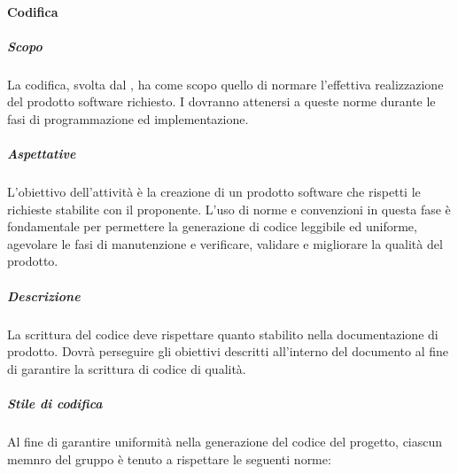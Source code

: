			\paragraph{Codifica}	
				\subparagraph{Scopo}
				La codifica, svolta dal , ha come scopo quello di normare l'effettiva realizzazione del prodotto software richiesto. I  dovranno attenersi a queste norme durante le fasi di programmazione ed implementazione.
				\subparagraph{Aspettative}
				L'obiettivo dell'attività è la creazione di un prodotto software che rispetti le richieste stabilite con il proponente. L'uso di norme e convenzioni in questa fase è fondamentale per permettere la generazione di codice leggibile ed uniforme, agevolare le fasi di manutenzione e verificare, validare e migliorare la qualità del prodotto.
				\subparagraph{Descrizione}
				La scrittura del codice deve rispettare quanto stabilito nella documentazione di prodotto. Dovrà perseguire gli obiettivi descritti all'interno del documento  al fine di garantire la scrittura di codice di qualità.
				\subparagraph{Stile di codifica}
				Al fine di garantire uniformità nella generazione del codice del progetto, ciascun memnro del gruppo è tenuto a rispettare le seguenti norme:
